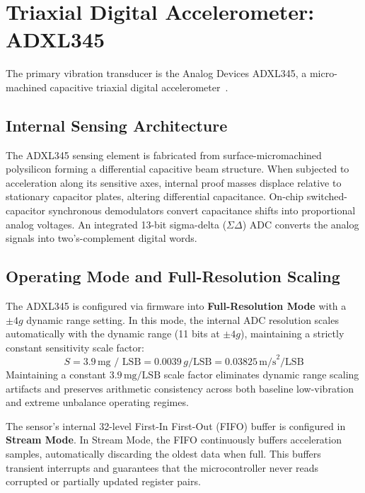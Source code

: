\section{Triaxial Digital Accelerometer: ADXL345}
The primary vibration transducer is the Analog Devices ADXL345, a micro-machined capacitive triaxial digital accelerometer~\cite{adxl345_datasheet}. 

\subsection{Internal Sensing Architecture}
The ADXL345 sensing element is fabricated from surface-micromachined polysilicon forming a differential capacitive beam structure. When subjected to acceleration along its sensitive axes, internal proof masses displace relative to stationary capacitor plates, altering differential capacitance. On-chip switched-capacitor synchronous demodulators convert capacitance shifts into proportional analog voltages. An integrated 13-bit sigma-delta ($\Sigma\Delta$) ADC converts the analog signals into two's-complement digital words.

\subsection{Operating Mode and Full-Resolution Scaling}
The ADXL345 is configured via firmware into \textbf{Full-Resolution Mode} with a $\pm 4g$ dynamic range setting. In this mode, the internal ADC resolution scales automatically with the dynamic range (11 bits at $\pm 4g$), maintaining a strictly constant sensitivity scale factor:
\begin{equation}
S = 3.9\,\text{mg / LSB} = 0.0039\,g/\text{LSB} = 0.03825\,\text{m/s}^2/\text{LSB}
\label{eq:scale_factor}
\end{equation}
Maintaining a constant $3.9\,\text{mg/LSB}$ scale factor eliminates dynamic range scaling artifacts and preserves arithmetic consistency across both baseline low-vibration and extreme unbalance operating regimes. 

The sensor's internal 32-level First-In First-Out (FIFO) buffer is configured in \textbf{Stream Mode}. In Stream Mode, the FIFO continuously buffers acceleration samples, automatically discarding the oldest data when full. This buffers transient interrupts and guarantees that the microcontroller never reads corrupted or partially updated register pairs.

